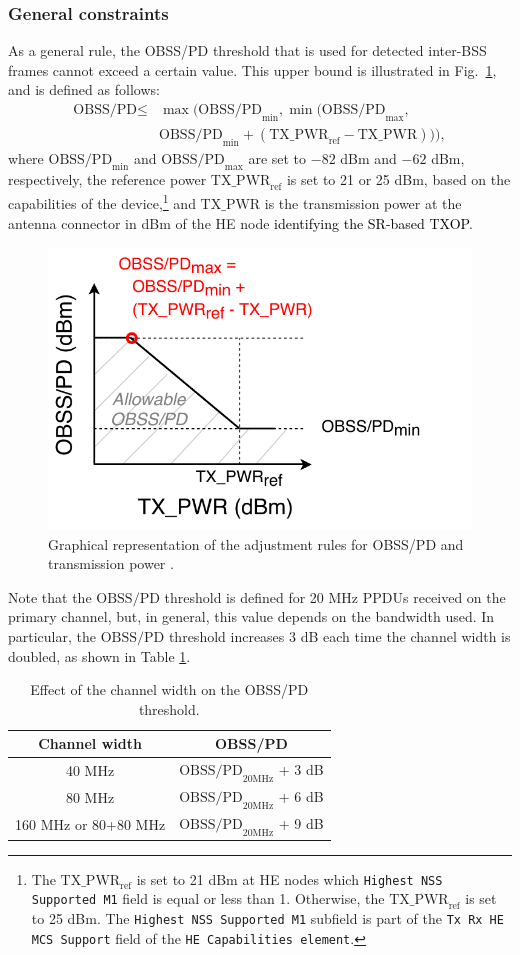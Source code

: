\documentclass[preprint,12pt]{elsarticle}
\begin{document}
\subsubsection{General constraints}
As a general rule, the OBSS/PD threshold that is used for detected inter-BSS frames cannot exceed a certain value. This upper bound is illustrated in Fig.~\ref{fig:fig_7}, and is defined as follows:
\begin{align}\nonumber \text{OBSS/PD} \leq & \max\Big(\text{OBSS/PD}_{\min}, \min\big(\text{OBSS/PD}_{\max},\\ & \text{OBSS/PD}_{\min} + (\text{TX\_PWR}_{\text{ref}}-\text{TX\_PWR})\big)\Big), \nonumber \end{align}
where $\text{OBSS/PD}_{\min}$ and $\text{OBSS/PD}_{\max}$ are set to $-82$ dBm and $-62$ dBm, respectively, the reference power $\text{TX\_PWR}_{\text{ref}}$ is set to 21 or 25 dBm, based on the
capabilities of the device,\footnote{The $\text{TX\_PWR}_{\text{ref}}$ is set to 21 dBm at HE nodes which \texttt{Highest NSS Supported M1} field is equal or less than 1. Otherwise, the  $\text{TX\_PWR}_{\text{ref}}$ is set to 25 dBm. The \texttt{Highest NSS Supported M1} subfield is part of the \texttt{Tx Rx HE MCS Support} field of the \texttt{HE Capabilities element}.} and $\text{TX\_PWR}$ is the transmission power at the antenna connector in dBm of the HE node \textcolor{black}{identifying the SR-based TXOP}.
\begin{figure}[ht!]
	\centering
	\includegraphics[width=0.4\columnwidth]{fig_10}
	\caption{Graphical representation of the adjustment rules for OBSS/PD and transmission power \cite{tgax2019draft}.}
	\label{fig:fig_7}
\end{figure}

Note that the $\text{OBSS/PD}$ threshold is defined for 20 MHz PPDUs received on the primary channel, but, in general, this value depends on the bandwidth used. In particular, the $\text{OBSS/PD}$ threshold increases 3 dB each time the channel width is doubled, as shown in Table \ref{tbl:sensitivity_channel_width}.
\begin{table}[ht!]
	\centering
	\begin{tabular}{|c|c|}
		\hline
		\textbf{Channel width} & \textbf{OBSS/PD} \\ \hline
		40 MHz & $\text{OBSS/PD}_{20 \text{MHz}}$ + 3 dB \\ \hline
		80 MHz & $\text{OBSS/PD}_{20 \text{MHz}}$ + 6 dB \\ \hline
		160 MHz or 80+80 MHz &  $\text{OBSS/PD}_{20 \text{MHz}}$ + 9 dB \\ \hline
	\end{tabular}
	\caption{Effect of the channel width on the OBSS/PD threshold.}
	\label{tbl:sensitivity_channel_width}
\end{table}
\end{document}
